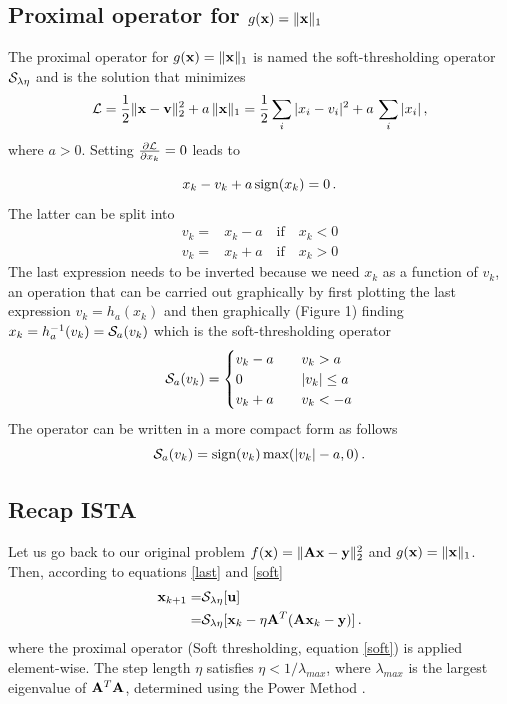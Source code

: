 \documentclass[11pt, oneside]{article}  	%
\def\be{\vspace{0.0cm}\begin{equation}}
\def\ee{\vspace{0.0cm}\end{equation}}
\begin{document}
\subsection{Proximal operator for $g({\bf x}) = \|{\bf x}\|_1$}

The proximal operator for $g({\bf x}) = \| {\bf x} \|_1$ is named the soft-thresholding operator ${\cal S}_{\lambda \eta}$ and is the solution that
minimizes 
\be {\cal L} = \frac{1}{2} \| {\bf x} -{\bf v}\|_2^2 + a\, \|{\bf x}\|_1 = \frac{1}{2} \sum_i | x_i - v_i|^2 + a\, \sum_i | x_i |\,,\ee
where $a>0$. 
Setting $\frac{ \partial {\cal L}}{\partial x_k}=0$ leads to 

\be x_k-v_k + a\, \mbox{sign}(x_k)=0\,. \label{soft_1}\ee
The latter can be split into  
\begin{align}
v_k =& x_k - a \quad \mbox{if} \quad x_k<0\\
v_k = &x_k + a \quad \mbox{if} \quad x_k>0
\end{align}
The last expression needs to be inverted because we need $x_k$ as a function of $v_k$, an operation that
can be carried out graphically by first plotting the last expression $v_k=h_a(x_k)$ and then graphically (Figure 1) finding $x_k=h_a^{-1}(v_k)={\cal S}_{a}(v_k)$ which is
the soft-thresholding operator
\be
{\cal S}_{a}(v_k) =
\begin{cases}
  v_k - a& \quad  v_k > a\\
  0   &\quad   |v_k|\leq a  \\
  v_k + a& \quad v_k < -a
\end{cases} \label{soft}
\ee
 The operator
can be written in a more compact form as follows
\begin{equation}
{\cal S}_{a}(v_k) = \mbox{sign}( v_k )\, \mbox{max}( |v_k |-a, 0)\,.
\end{equation}


\subsection{Recap ISTA}
Let us go back to our original problem $f({\bf x}) = \| {\bf A } {\bf x} - {\bf y}\|_2^2$ and $g({\bf x}) = \| {\bf x} \|_1$. Then, according to equations \ref{last} and \ref{soft}
\begin{align}
{\bf x}_{k+1} = & {\cal S}_{\lambda \eta} [{\bf u}]\\
           = & {\cal S}_{\lambda \eta} [{\bf x}_{k} - \eta {\bf A}^T ({\bf A} {\bf x}_k -{\bf y}) ] \,. \label{last2} 
\end{align}
where the proximal operator (Soft thresholding, equation \ref{soft}) is applied element-wise.
The step length \(\eta\) satisfies \(\eta < 1/\lambda_{max}\), where \(\lambda_{max}\) is the largest eigenvalue of \({\bf A}^T {\bf A}\), determined using the Power Method \citep{GoluVanl96}.
\end{document}
